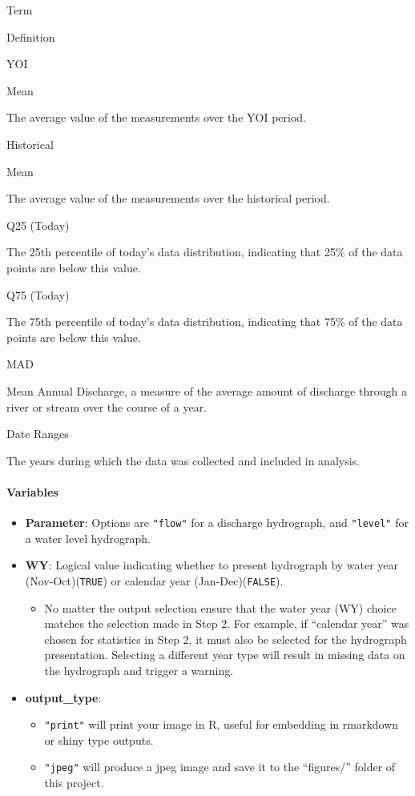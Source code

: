 \documentclass[
]{article}
\providecommand{\tightlist}{%
  \setlength{\itemsep}{0pt}\setlength{\parskip}{0pt}}
\begin{document}
Term

Definition

YOI

Mean

The average value of the measurements over the YOI period.

Historical

Mean

The average value of the measurements over the historical period.

Q25 (Today)

The 25th percentile of today's data distribution, indicating that 25\%
of the data points are below this value.

Q75 (Today)

The 75th percentile of today's data distribution, indicating that 75\%
of the data points are below this value.

MAD

Mean Annual Discharge, a measure of the average amount of discharge
through a river or stream over the course of a year.

Date Ranges

The years during which the data was collected and included in analysis.

\hypertarget{variables}{%
\paragraph{Variables}\label{variables}}

\begin{itemize}
\item
  \textbf{Parameter}: Options are \texttt{"flow"} for a discharge
  hydrograph, and \texttt{"level"} for a water level hydrograph.
\item
  \textbf{WY}: Logical value indicating whether to present hydrograph by
  water year (Nov-Oct)(\texttt{TRUE}) or calendar year
  (Jan-Dec)(\texttt{FALSE}).

  \begin{itemize}
  \tightlist
  \item
    No matter the output selection ensure that the water year (WY)
    choice matches the selection made in Step 2. For example, if
    ``calendar year'' was chosen for statistics in Step 2, it must also
    be selected for the hydrograph presentation. Selecting a different
    year type will result in missing data on the hydrograph and trigger
    a warning.
  \end{itemize}
\item
  \textbf{output\_type}:

  \begin{itemize}
  \tightlist
  \item
    \texttt{"print"} will print your image in R, useful for embedding in
    rmarkdown or shiny type outputs.
  \item
    \texttt{"jpeg"} will produce a jpeg image and save it to the
    ``figures/'' folder of this project.
  \end{itemize}
\end{itemize}
\end{document}
